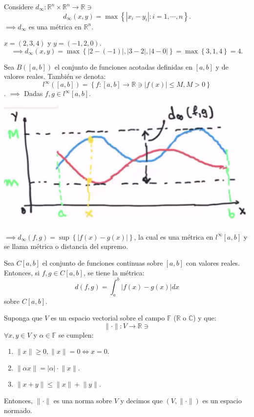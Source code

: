 \begin{ejemplo}
	Considere $d_\infty: \mathbb{R}^n\times \mathbb{R}^n\to \mathbb{R}\ni$ 
	$$d_\infty (x,y)=\max\left\{|x_i-y_i|:i=1,\cdots, n\right\}.$$
	$\implies d_\infty$ es una métrica en $\mathbb{R}^n$. 
\end{ejemplo}

\begin{ejemplo}
	$x=(2,3,4)$ y $y=(-1,2,0)$. 
	$$\implies d_\infty(x,y)=\max\left\{|2-(-1)|,|3-2|,|4-0|\right\}=\max\left\{3,1,4\right\}=4.$$
\end{ejemplo}

\begin{ejemplo}
	Sea $B\left([a,b]\right)$ el conjunto de funciones acotadas definidas en $[a,b]$ y de valores reales. También se denota: 
	$$l^{\infty}\left([a,b]\right)=\left\{f:[a,b]\to \mathbb{R}\ni |f(x)|\leq M, M>0\right\}$$.
	$\implies$ Dadas $f,g\in l^{\infty}[a,b]$. 
	
	\begin{center}
		\includegraphics[scale=0.5]{images/1/2.png}
	\end{center}
$\implies d_\infty(f,g)=\sup \left\{|f(x)-g(x)|\right\}$, la cual es una métrica en $l^{\infty}[a,b]$ y se llama métrica o distancia del supremo.
\end{ejemplo}

\begin{ejemplo}
	Sea $C[a,b]$ el conjunto de funciones continuas sobre $[a,b]$ con valores reales. Entonces, si $f,g\in C[a,b]$, se tiene la métrica: $$d(f,g)=\int_a^b |f(x)-g(x)|dx$$
	sobre $C[a,b]$. 
\end{ejemplo}

\begin{definicion}
Suponga que $V$ es un espacio vectorial sobre el campo $\mathbb{F}$ ($\mathbb{R}$ o $\mathbb{C}$) y que: 
$$\lVert \cdot \rVert: V\to \mathbb{R}\ni $$
$\forall x,y\in V$ y $\alpha \in\mathbb{F}$ se cumplen: 
\begin{enumerate}
	\item $\lVert x\rVert\geq 0, \lVert x\rVert =0 \iff x=0$. 
	\item $\lVert \alpha x \rVert = |\alpha| \cdot \lVert x \rVert$. 
	\item $\lVert x+y\rVert \leq \lVert x\rVert + \lVert y\rVert$. 
\end{enumerate}
Entonces, $\lVert \cdot \rVert$ es una norma sobre $V$ y decimos que $(V, \lVert\cdot \rVert)$ es un espacio normado.
\end{definicion}

